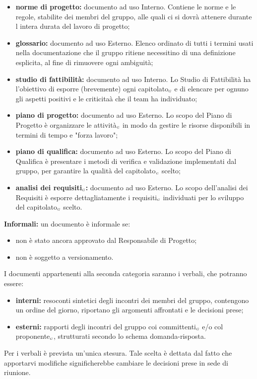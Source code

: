 \begin{itemize}
\item \textbf{norme di progetto:} documento ad uso Interno. Contiene le norme e le regole, stabilite dei membri del gruppo, alle quali ci si dovrà attenere durante l intera durata del lavoro di progetto;
	\item \textbf{glossario:} documento ad uso Esterno. Elenco ordinato di tutti i termini usati nella documentazione che il gruppo ritiene necessitino di una definizione esplicita, al fine di rimuovere ogni ambiguità;
		\item \textbf{studio di fattibilità:} documento ad uso Interno. Lo Studio di Fattibilità ha l’obiettivo di esporre (brevemente) ogni capitolato$_{\scaleto{G}{3pt}}$ e di elencare per ognuno gli aspetti positivi e le criticitaà che il team ha individuato;
			\item \textbf{piano di progetto:} documento ad uso Esterno. Lo scopo del Piano di Progetto è organizzare le attività$_{\scaleto{G}{3pt}}$ in modo da gestire le risorse disponibili in termini di tempo e "forza lavoro";
				\item \textbf{piano di qualifica:} documento ad uso Esterno. Lo scopo del Piano di Qualifica è presentare i metodi di verifica e validazione implementati dal gruppo, per garantire la qualità del capitolato$_{\scaleto{G}{3pt}}$ scelto;
					\item \textbf{analisi dei requisiti$_{\scaleto{G}{3pt}}$:} documento ad uso Esterno. Lo scopo dell'analisi dei Requisiti è esporre dettagliatamente i requisiti$_{\scaleto{G}{3pt}}$ individuati per lo sviluppo del capitolato$_{\scaleto{G}{3pt}}$ scelto.
\end{itemize}
 \textbf{Informali:} un documento è informale se:
\begin{itemize}
\item non è stato ancora approvato dal Responsabile di Progetto;
	\item non è soggetto a versionamento.
\end{itemize}
I documenti appartenenti alla seconda categoria saranno i verbali, che potranno
essere:
\begin{itemize}
\item \textbf{interni:} resoconti sintetici degli incontri dei membri del gruppo, contengono un ordine del giorno, riportano gli argomenti affrontati e le decisioni prese;
	\item \textbf{esterni:} rapporti degli incontri del gruppo coi committenti$_{\scaleto{G}{3pt}}$ e/o col proponente$_{\scaleto{G}{3pt}}$, strutturati secondo lo schema domanda-risposta.
\end{itemize}
Per i verbali è prevista un’unica stesura. Tale scelta è dettata dal fatto che apportarvi modifiche significherebbe cambiare le decisioni prese in sede di riunione.
